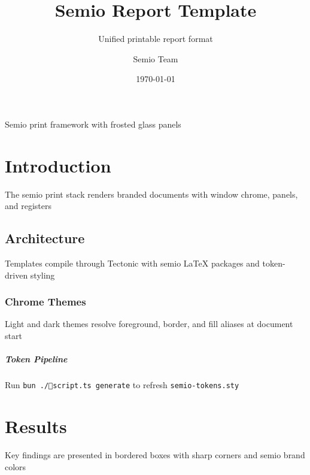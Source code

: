 \title{Semio Report Template}
\author{Semio Team}
\date{\today}
\subtitle{Unified printable report format}




\maketitle
\tableofcontents

\begin{Panel}[anchor=top-right, x=1cm, y=5cm, width=5.5cm]
  Semio print framework with frosted glass panels
\end{Panel}

\chapter{Introduction}
The semio print stack renders branded documents with window chrome, panels, and registers

\section{Architecture}
\begin{Window}[title=Print Pipeline]
  Templates compile through Tectonic with semio LaTeX packages and token-driven styling
\end{Window}

\subsection{Chrome Themes}
Light and dark themes resolve foreground, border, and fill aliases at document start

\paragraph{Token Pipeline}
Run \texttt{bun ./📜️script.ts generate} to refresh \texttt{semio-tokens.sty}

\chapter{Results}
\begin{Blockquote}
  Key findings are presented in bordered boxes with sharp corners and semio brand colors
\end{Blockquote}


